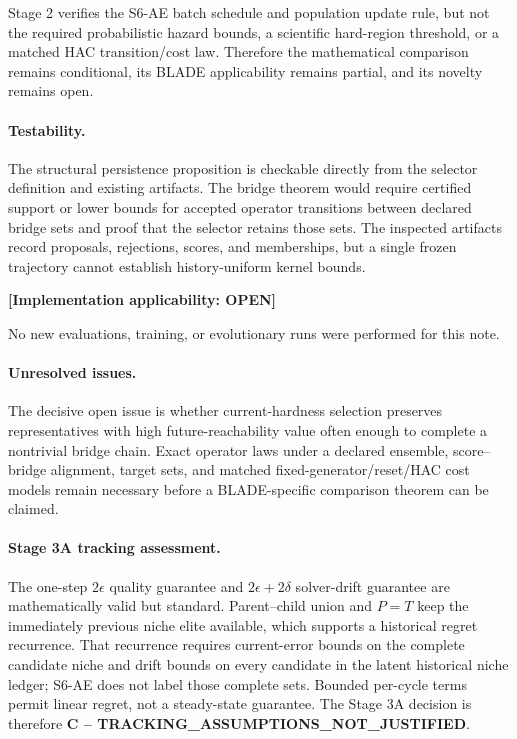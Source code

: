 \documentclass[11pt]{article}
\newcommand{\istatus}[1]{\textbf{[Implementation applicability: #1]}}
\begin{document}
Stage 2 verifies the S6-AE batch schedule and population update rule, but not
the required probabilistic hazard bounds, a scientific hard-region threshold,
or a matched HAC transition/cost law. Therefore the mathematical comparison
remains conditional, its BLADE applicability remains partial, and its novelty
remains open.

\paragraph{Testability.}
The structural persistence proposition is checkable directly from the
selector definition and existing artifacts. The bridge theorem would require
certified support or lower bounds for accepted operator transitions between
declared bridge sets and proof that the selector retains those sets. The
inspected artifacts record proposals, rejections, scores, and memberships, but
a single frozen trajectory cannot establish history-uniform kernel bounds.
\par\istatus{OPEN}\par
No new evaluations, training, or evolutionary runs were performed for this
note.

\paragraph{Unresolved issues.}
The decisive open issue is whether current-hardness selection preserves
representatives with high future-reachability value often enough to complete a
nontrivial bridge chain. Exact operator laws under a declared ensemble,
score--bridge alignment, target sets, and matched fixed-generator/reset/HAC
cost models remain necessary before a BLADE-specific comparison theorem can
be claimed.

\paragraph{Stage 3A tracking assessment.}
The one-step $2\epsilon$ quality guarantee and
$2\epsilon+2\delta$ solver-drift guarantee are mathematically valid but
standard. Parent--child union and $P=T$ keep the immediately previous niche
elite available, which supports a historical regret recurrence. That
recurrence requires current-error bounds on the complete candidate niche and
drift bounds on every candidate in the latent historical niche ledger; S6-AE
does not label those complete sets. Bounded per-cycle terms permit linear
regret, not a steady-state guarantee. The Stage 3A decision is therefore
\textbf{C -- TRACKING\_ASSUMPTIONS\_NOT\_JUSTIFIED}.
\end{document}
